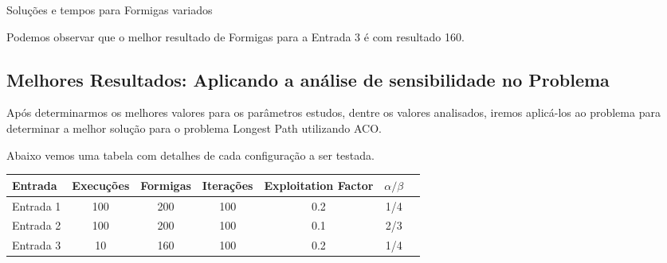 \documentclass{article}
\begin{document}
\par
Soluções e tempos para Formigas variados
\newline
\pgfplotsset{compat=newest}

\par
Podemos observar que o melhor resultado de Formigas para a Entrada 3 é com resultado 160. 


\newpage


\subsection{Melhores Resultados: Aplicando a análise de sensibilidade no Problema} 


Após determinarmos os melhores valores para os parâmetros estudos, dentre os valores analisados, iremos aplicá-los ao problema para determinar a melhor solução para o problema Longest Path utilizando ACO.

Abaixo vemos uma tabela com detalhes de cada configuração a ser testada. 
\newline
\begin{center}
    \begin{tabular}{l*{6}{c}}
    \hline
    Entrada & Execuções & Formigas & Iterações & Exploitation Factor &  $\alpha/\beta$ \\ \hline
    Entrada 1 & 100 &200 & 100 & 0.2 & 1/4 \\ \hline
    Entrada 2 & 100 &200 & 100 & 0.1 & 2/3\\ \hline
    Entrada 3 & 10 &160 & 100 & 0.2 & 1/4\\ \hline
    \end{tabular}
\end{center}
\end{document}
